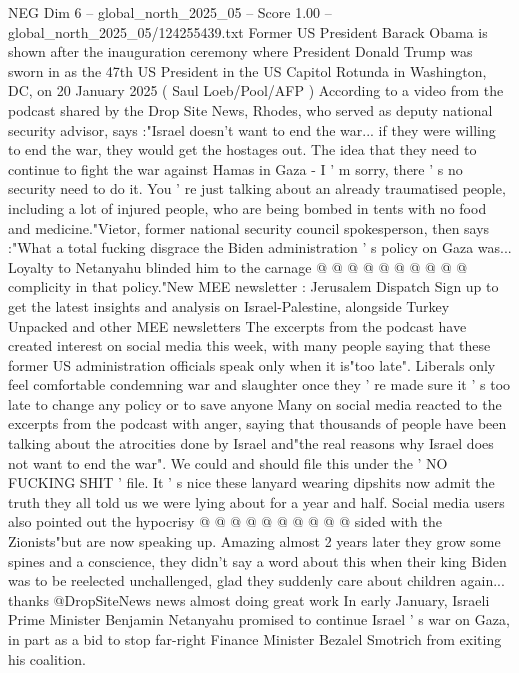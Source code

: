 \begin{textsample}{NEG Dim 6 – global\_north\_2025\_05 – Score 1.00 – global\_north\_2025\_05/124255439.txt}  \label{ex:f6_neg_384}
Former US President Barack Obama is shown after the inauguration ceremony where President Donald Trump was sworn in as the 47th US President in the US Capitol Rotunda in Washington, DC, on 20 January 2025 ( Saul Loeb/Pool/AFP ) According to a video from the podcast shared by the Drop Site News, Rhodes, who served as deputy national security advisor, says :"Israel doesn't want to end the war... if they were willing to end the war, they would get the hostages out.
The idea that they need to continue to fight the war against Hamas in Gaza - I ' m sorry, there ' s no security need to do it.
You ' re just talking about an already traumatised people, including a lot of injured people, who are being bombed in tents with no food and medicine."Vietor, former national security council spokesperson, then says :"What a total fucking disgrace the Biden administration ' s policy on Gaza was...
Loyalty to Netanyahu blinded him to the carnage @ @ @ @ @ @ @ @ @ @ complicity in that policy."New MEE newsletter : Jerusalem Dispatch Sign up to get the latest insights and analysis on Israel-Palestine, alongside Turkey Unpacked and other MEE newsletters The excerpts from the podcast have created interest on social media this week, with many people saying that these former US administration officials speak only when it is"too late".
Liberals only feel comfortable condemning war and slaughter once they ' re made sure it ' s too late to change any policy or to save anyone Many on social media reacted to the excerpts from the podcast with anger, saying that thousands of people have been talking about the atrocities done by Israel and"the real reasons why Israel does not want to end the war".
We could and should file this under the ' NO FUCKING SHIT ' file.
It ' s nice these lanyard wearing dipshits now admit the truth they all told us we were lying about for a year and half.
Social media users also pointed out the hypocrisy @ @ @ @ @ @ @ @ @ @ sided with the Zionists"but are now speaking up.
Amazing almost 2 years later they grow some spines and a conscience, they didn't say a word about this when their king Biden was to be reelected unchallenged, glad they suddenly care about children again... thanks @DropSiteNews news almost doing great work In early January, Israeli Prime Minister Benjamin Netanyahu promised to continue Israel ' s war on Gaza, in part as a bid to stop far-right Finance Minister Bezalel Smotrich from exiting his coalition.

\end{textsample}
